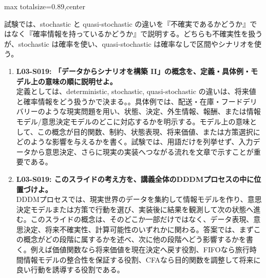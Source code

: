 \begin{minipage}[t]{0.58\textwidth}
\begin{adjustbox}{max totalsize={\textwidth}{0.89\textheight},center}
\begin{minipage}{\textwidth}
試験では、stochastic と quasi-stochastic の違いを『不確実であるかどうか』ではなく『確率情報を持っているかどうか』で説明する。どちらも不確実性を扱うが、stochastic は確率を使い、quasi-stochastic は確率なしで区間やシナリオを使う。\par{}\begin{enumerate}\item \textbf{L03-S019: 「データからシナリオを構築 II」の概念を、定義・具体例・モデル上の意味の順に説明せよ。}\\定義としては、deterministic, stochastic, quasi-stochastic の違いは、将来値と確率情報をどう扱うかで決まる。。具体例では、配送・在庫・フードデリバリーのような現実問題を用い、状態、決定、外生情報、報酬、または情報モデル/意思決定モデルのどこに対応するかを明示する。モデル上の意味として、この概念が目的関数、制約、状態表現、将来価値、または方策選択にどのような影響を与えるかを書く。試験では、用語だけを列挙せず、入力データから意思決定、さらに現実の実装へつながる流れを文章で示すことが重要である。\item \textbf{L03-S019: このスライドの考え方を、講義全体のDDDMプロセスの中に位置づけよ。}\\DDDMプロセスでは、現実世界のデータを集約して情報モデルを作り、意思決定モデルまたは方策で行動を選び、実装後に結果を観測して次の状態へ進む。このスライドの概念は、そのどこか一部だけではなく、データ表現、意思決定、将来不確実性、計算可能性のいずれかに関わる。答案では、まずこの概念がどの段階に属するかを述べ、次に他の段階へどう影響するかを書く。例えば価値関数なら将来価値を現在決定へ戻す役割、FIFOなら旅行時間情報モデルの整合性を保証する役割、CFAなら目的関数を調整して将来に良い行動を誘導する役割である。\end{enumerate}
\end{minipage}
\end{adjustbox}
\end{minipage}


